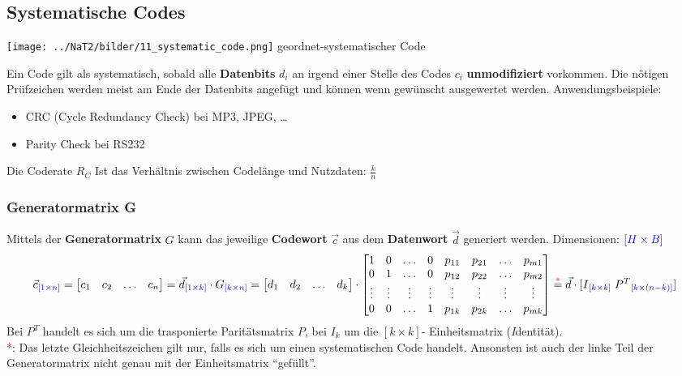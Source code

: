 \subsection{Systematische Codes}
\begin{minipage}{5.5cm}
	\texttt{[image: ../NaT2/bilder/11\_systematic\_code.png]}
	\centering geordnet-systematischer Code
\end{minipage}
\begin{minipage}{12.8cm}
	Ein Code gilt als systematisch, sobald alle \textbf{Datenbits} $d_i$ an irgend einer Stelle des Codes $c_i$
	\textbf{unmodifiziert} vorkommen. Die nötigen Prüfzeichen werden meist am Ende
	der Datenbits angefügt und können wenn gewünscht ausgewertet werden. Anwendungsbeispiele:
	\begin{itemize}
    	\item CRC (Cycle Redundancy Check) bei MP3, JPEG, \ldots
    	\item Parity Check bei RS232
  	\end{itemize}	
	Die Coderate $R_C$ Ist das Verhältnis zwischen Codelänge und Nutzdaten: $\frac{k}{n}$
\end{minipage} 

\subsubsection{Generatormatrix G }
Mittels der \textbf{Generatormatrix} $G$ kann das jeweilige \textbf{Codewort} $\vec{c}$ aus dem \textbf{Datenwort} $\vec{d}$
generiert werden. Dimensionen: $\textcolor{blue}{[H\times B]}$
$$ \vec{c}\textcolor{blue}{_{[1 \times n]}} = \begin{bmatrix} c_1 & c_2 & \ldots & c_n \end{bmatrix} =
\vec{d}\textcolor{blue}{_{[1 \times k]}} \cdot G\textcolor{blue}{_{[k \times n]}} =
                \begin{bmatrix} d_1 & d_2 & \ldots & d_k \end{bmatrix} 
				\cdot \begin{bmatrix} 
					1 & 0 & \ldots & 0 & p_{11} & p_{21} & \ldots & p_{m1} \\              
					0 & 1 & \ldots & 0 & p_{12} & p_{22} & \ldots & p_{m2} \\
					\vdots & \vdots & \vdots & \vdots & \vdots & \vdots & \vdots & \vdots \\
					0 & 0 & \ldots & 1 & p_{1k} & p_{2k} & \ldots & p_{mk} \\
				\end{bmatrix} \overset{\textcolor{red}{*}}{=} \vec{d} \cdot [I\textcolor{blue}{_{[k \times k]}} \;
				P^T\textcolor{blue}{_{[k \times (n-k)]}}] $$ Bei $P^T$ handelt es sich um die trasponierte
				Paritätsmatrix $P$, bei $I_k$ um die $[k \times k]$- Einheitsmatrix (\emph{I}dentität). \\
\textcolor{red}{*}: Das letzte Gleichheitszeichen gilt nur, falls
es sich um einen systematischen Code handelt. Ansonsten ist auch der linke Teil der Generatormatrix
nicht genau mit der Einheitsmatrix ``gefüllt''.

